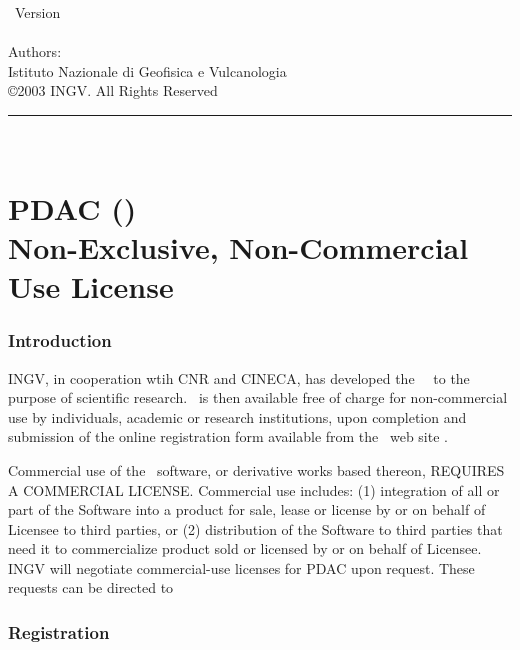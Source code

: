 
\thispagestyle{empty}

\vspace*{0.1in}

\begin{centering}
{\LARGE \PDAC\ Version \PDACVERSION}\\
{\Large \PDACNOTES}\\
\bigskip
{\large Authors: \UGAUTHORS} \\
\medskip
{\large Istituto Nazionale di Geofisica e Vulcanologia } \\
\bigskip
{\large \copyright 2003 INGV.
All Rights Reserved} \\
\bigskip
\end{centering}

  \rule{6in}{0.04in}				\\	\vspace{0.25in}

\section*{PDAC (\PDACNAME )\\
Non-Exclusive, Non-Commercial Use License}

\subsubsection*{Introduction}

INGV, in cooperation wtih CNR and CINECA,
has developed the \PDACNAME\ \PDAC\
to the purpose of scientific research.
\PDAC\ is then available free of charge for
non-commercial use by individuals, academic or research institutions,
upon completion and submission of the online registration form available 
from the \PDAC\ web site \PDACURL.

Commercial use of the \PDAC\ software, or derivative works based thereon,
REQUIRES A COMMERCIAL LICENSE. Commercial use includes: 
(1) integration of all or part of the Software into a product for sale, 
lease or license by or on behalf of Licensee to third parties, or 
(2) distribution of the Software to third parties that need it to 
commercialize product sold or licensed by or on behalf of Licensee.  
INGV will negotiate commercial-use licenses for PDAC upon request. 
These requests can be directed to \PDACADDRESS

\subsubsection*{Registration}

